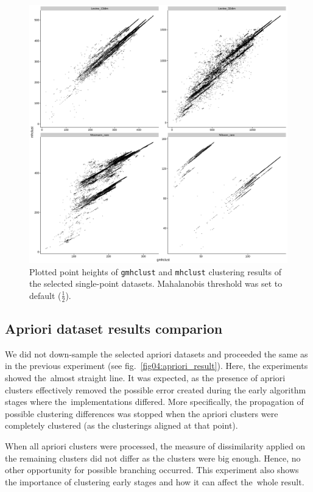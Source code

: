 \begin{figure}\centering
	\includegraphics[width=\linewidth]{img/single_result}
	\caption{Plotted point heights of \texttt{gmhclust} and \texttt{mhclust} clustering results of the selected single-point datasets. Mahalanobis threshold was set to default ($\frac{1}{2}$).}
	\label{fig04:single_result}
\end{figure}

\subsection{Apriori dataset results comparion}

We did not down-sample the selected apriori datasets and proceeded the same as in the previous experiment (see fig.~\ref{fig04:apriori_result}). Here, the experiments showed the~almost straight line. It was expected, as the presence of apriori clusters effectively removed the possible error created during the early algorithm stages where the~implementations differed. More specifically, the propagation of possible clustering differences was stopped when the apriori clusters were completely clustered (as the clusterings aligned at that point).

When all apriori clusters were processed, the measure of dissimilarity applied on the remaining clusters did not differ as the clusters were big enough. Hence, no other opportunity for possible branching occurred. This experiment also shows the importance of clustering early stages and how it can affect the~whole result.

